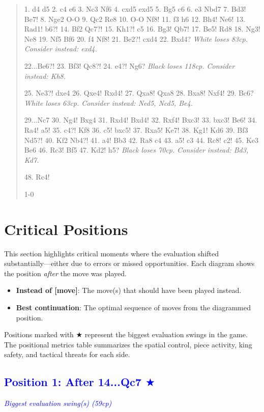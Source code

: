 \documentclass[11pt]{book}
\begin{document}
\begin{quote}
1. d4 d5
2. c4 e6
3. Nc3 Nf6
4. cxd5 exd5
5. Bg5 c6
6. e3 Nbd7
7. Bd3! Be7!
8. Nge2 O-O
9. Qc2 Re8
10. O-O Nf8!
11. f3 h6
12. Bh4! Ne6!
13. Rad1! b6?!
14. Bf2 Qc7?!
15. Kh1?! c5
16. Bg3! Qb7!
17. Be5! Rd8
18. Ng3! Ne8
19. Nf5 Bf6
20. f4 Nf8!
21. Be2?! cxd4
22. Bxd4?
\textit{White loses 83cp. Consider instead: exd4.}

22...Be6?!
23. Bf3! Qc8?!
24. e4?! Ng6?
\textit{Black loses 118cp. Consider instead: Kh8.}

25. Ne3?! dxe4
26. Qxe4! Rxd4!
27. Qxa8! Qxa8
28. Bxa8! Nxf4!
29. Bc6?
\textit{White loses 63cp. Consider instead: Ned5, Ncd5, Be4.}

29...Nc7
30. Ng4! Bxg4
31. Rxd4! Bxd4!
32. Rxf4! Bxc3!
33. bxc3! Be6!
34. Ra4! a5!
35. c4?! Kf8
36. c5! bxc5!
37. Rxa5! Ke7!
38. Kg1! Kd6
39. Bf3 Nd5?!
40. Kf2 Nb4?!
41. a4! Bb3
42. Ra8 c4
43. a5! c3
44. Rc8! c2!
45. Ke3 Be6
46. Rc3! Bf5
47. Kd2! h5?
\textit{Black loses 70cp. Consider instead: Bd3, Kd7.}

48. Rc4!

1-0
\end{quote}

\section{Critical Positions}

This section highlights critical moments where the evaluation shifted substantially---either due to errors or missed opportunities. Each diagram shows the position \emph{after} the move was played.

\begin{itemize}
\item \textbf{Instead of [move]}: The move(s) that should have been played instead.
\item \textbf{Best continuation}: The optimal sequence of moves from the diagrammed position.
\end{itemize}

Positions marked with {\color{blue}$\bigstar$} represent the biggest evaluation swings in the game. The positional metrics table summarizes the spatial control, piece activity, king safety, and tactical threats for each side.

\subsection*{\textcolor{blue}{Position 1: After 14...Qc7 $\bigstar$}}
\textit{\textcolor{blue}{Biggest evaluation swing(s) (59cp)}}
\end{document}
